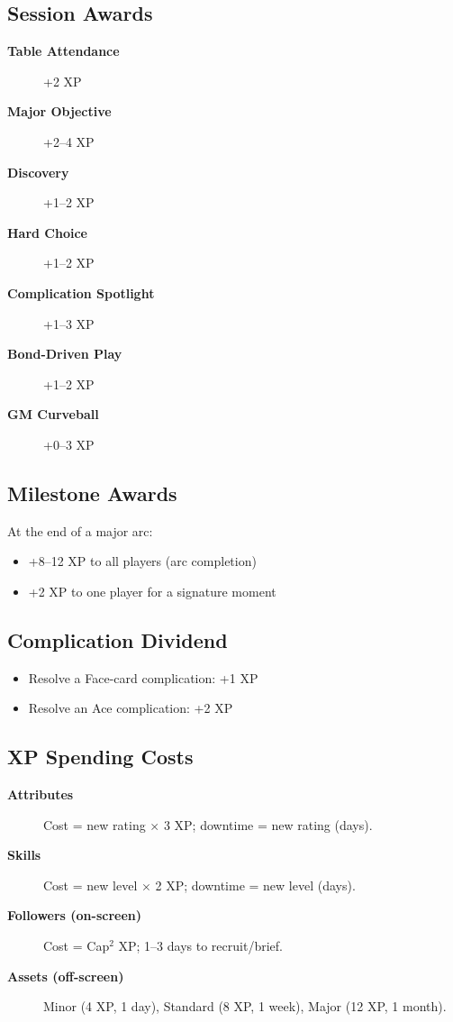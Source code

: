 \subsection{Session Awards}
\label{subsec:session-awards}
\begin{description}
\item[\textbf{Table Attendance}] +2 XP
\item[\textbf{Major Objective}] +2–4 XP
\item[\textbf{Discovery}] +1–2 XP
\item[\textbf{Hard Choice}] +1–2 XP
\item[\textbf{Complication Spotlight}] +1–3 XP
\item[\textbf{Bond-Driven Play}] +1–2 XP
\item[\textbf{GM Curveball}] +0–3 XP
\end{description}

\subsection{Milestone Awards}
\label{subsec:milestone-awards}
At the end of a major arc:
\begin{itemize}
\item +8–12 XP to all players (arc completion)
\item +2 XP to one player for a signature moment
\end{itemize}

\subsection{Complication Dividend}
\label{subsec:complication-dividend}
\begin{itemize}
\item Resolve a Face-card complication: +1 XP
\item Resolve an Ace complication: +2 XP
\end{itemize}

\subsection{XP Spending Costs}
\label{subsec:xp-spending}
\begin{description}
\item[\textbf{Attributes}] Cost = new rating $\times$ 3 XP; downtime = new rating (days). 
\item[\textbf{Skills}] Cost = new level $\times$ 2 XP; downtime = new level (days). 
\item[\textbf{Followers (on-screen)}] Cost = Cap$^{2}$ XP; 1–3 days to recruit/brief. 
\item[\textbf{Assets (off-screen)}] Minor (4 XP, 1 day), Standard (8 XP, 1 week), Major (12 XP, 1 month). 
\end{description}

